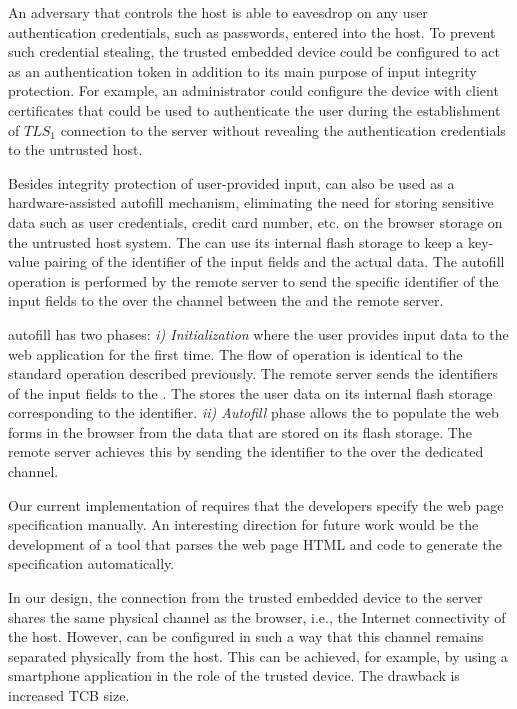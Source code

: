  An adversary that controls the host is able to eavesdrop on any user authentication credentials, such as passwords, entered into the host. To prevent such credential stealing, the trusted embedded device could be configured to act as an authentication token in addition to its main purpose of input integrity protection. For example, an administrator could configure the device with client certificates that could be used to authenticate the user during the establishment of $TLS_1$ connection to the server without revealing the authentication credentials to the untrusted host.

 Besides integrity protection of user-provided input, \device can also be used as a hardware-assisted autofill mechanism, eliminating the need for storing sensitive data such as user credentials, credit card number, etc. on the browser storage on the untrusted host system. The \device can use its internal flash storage to keep a key-value pairing of the identifier of the input fields and the actual data. The autofill operation is performed by the remote server to send the specific identifier of the input fields to the \device over the \tls channel between the \device and the remote server. 

\name autofill has two phases: 
\emph{i) Initialization} where the user provides input data to the web application for the first time. The flow of operation is identical to the standard \name operation described previously. The remote server sends the identifiers of the input fields to the \device. The \device stores the user data on its internal flash storage corresponding to the identifier. \emph{ii) Autofill} phase allows the \device to populate the web forms in the browser from the data that are stored on its flash storage. The remote server achieves this by sending the identifier to the \device over the dedicated \tls channel.

 Our current implementation of \tool requires that the developers specify the web page specification manually. An interesting direction for future work would be the development of a tool that parses the web page HTML and \js code to generate the specification automatically. 

 In our design, the connection from the trusted embedded device to the server shares the same physical channel as the browser, i.e., the Internet connectivity of the host. However, \tool can be configured in such a way that this channel remains separated physically from the host. This can be achieved, for example, by using a smartphone application in the role of the trusted device. The drawback is increased TCB size.

